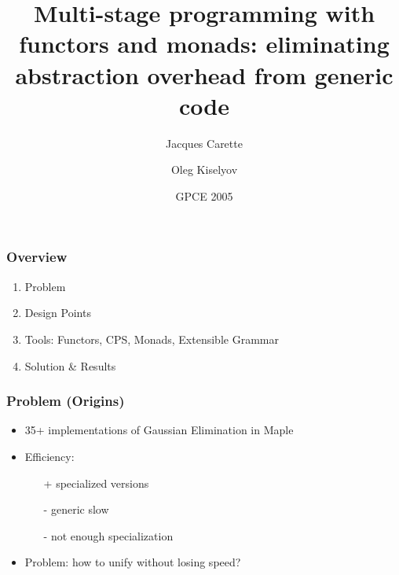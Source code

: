 \documentclass{beamer}
\title{Multi-stage programming with functors and monads:
eliminating abstraction overhead from generic code}
\author{Jacques Carette\inst{1} \and
Oleg Kiselyov\inst{2}}
\institute{\inst{1}McMaster University \inst{2} FNMOC}
\date{GPCE 2005}
\begin{document}
\divide{}
\divide{}
\divide{}
\divide{}


\newcommand{\seq}[1]{{\langle #1 \rangle}}
\newcommand{\set}[1]{{\{ #1 \}}}
\newcommand{\tuple}[1]{{( #1 )}}
\newcommand{\mname}[1]{\mbox{\sf #1}}
\newcommand{\Nat}{\mathbb N}


\begin{frame}
\titlepage
\end{frame}

\begin{frame}
\frametitle{Overview}
\begin{enumerate}
    \item Problem
    \item Design Points
    \item Tools: Functors, CPS, Monads, Extensible Grammar
    \item Solution \& Results
\end{enumerate}
\end{frame}

\begin{frame}
\frametitle{Problem (Origins)}
    \begin{itemize}
        \item 35+ implementations of Gaussian Elimination in Maple
        \item Efficiency:
            \begin{itemize}
                \item[+] specialized versions 
                \item[-] generic slow
                \item[-] not enough specialization
            \end{itemize}
        \item Problem: how to unify without losing speed?
    \end{itemize}
\end{frame}
\end{document}
